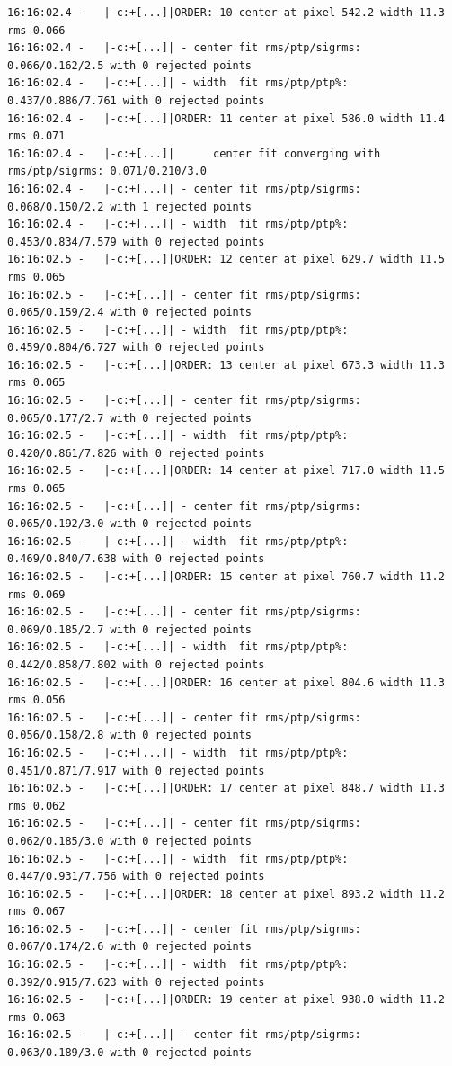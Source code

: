 \begin{lstlisting}[style=text]
16:16:02.4 -   |-c:+[...]|ORDER: 10 center at pixel 542.2 width 11.3 rms 0.066
16:16:02.4 -   |-c:+[...]| - center fit rms/ptp/sigrms: 0.066/0.162/2.5 with 0 rejected points
16:16:02.4 -   |-c:+[...]| - width  fit rms/ptp/ptp%: 0.437/0.886/7.761 with 0 rejected points
16:16:02.4 -   |-c:+[...]|ORDER: 11 center at pixel 586.0 width 11.4 rms 0.071
16:16:02.4 -   |-c:+[...]|      center fit converging with rms/ptp/sigrms: 0.071/0.210/3.0
16:16:02.4 -   |-c:+[...]| - center fit rms/ptp/sigrms: 0.068/0.150/2.2 with 1 rejected points
16:16:02.4 -   |-c:+[...]| - width  fit rms/ptp/ptp%: 0.453/0.834/7.579 with 0 rejected points
16:16:02.5 -   |-c:+[...]|ORDER: 12 center at pixel 629.7 width 11.5 rms 0.065
16:16:02.5 -   |-c:+[...]| - center fit rms/ptp/sigrms: 0.065/0.159/2.4 with 0 rejected points
16:16:02.5 -   |-c:+[...]| - width  fit rms/ptp/ptp%: 0.459/0.804/6.727 with 0 rejected points
16:16:02.5 -   |-c:+[...]|ORDER: 13 center at pixel 673.3 width 11.3 rms 0.065
16:16:02.5 -   |-c:+[...]| - center fit rms/ptp/sigrms: 0.065/0.177/2.7 with 0 rejected points
16:16:02.5 -   |-c:+[...]| - width  fit rms/ptp/ptp%: 0.420/0.861/7.826 with 0 rejected points
16:16:02.5 -   |-c:+[...]|ORDER: 14 center at pixel 717.0 width 11.5 rms 0.065
16:16:02.5 -   |-c:+[...]| - center fit rms/ptp/sigrms: 0.065/0.192/3.0 with 0 rejected points
16:16:02.5 -   |-c:+[...]| - width  fit rms/ptp/ptp%: 0.469/0.840/7.638 with 0 rejected points
16:16:02.5 -   |-c:+[...]|ORDER: 15 center at pixel 760.7 width 11.2 rms 0.069
16:16:02.5 -   |-c:+[...]| - center fit rms/ptp/sigrms: 0.069/0.185/2.7 with 0 rejected points
16:16:02.5 -   |-c:+[...]| - width  fit rms/ptp/ptp%: 0.442/0.858/7.802 with 0 rejected points
16:16:02.5 -   |-c:+[...]|ORDER: 16 center at pixel 804.6 width 11.3 rms 0.056
16:16:02.5 -   |-c:+[...]| - center fit rms/ptp/sigrms: 0.056/0.158/2.8 with 0 rejected points
16:16:02.5 -   |-c:+[...]| - width  fit rms/ptp/ptp%: 0.451/0.871/7.917 with 0 rejected points
16:16:02.5 -   |-c:+[...]|ORDER: 17 center at pixel 848.7 width 11.3 rms 0.062
16:16:02.5 -   |-c:+[...]| - center fit rms/ptp/sigrms: 0.062/0.185/3.0 with 0 rejected points
16:16:02.5 -   |-c:+[...]| - width  fit rms/ptp/ptp%: 0.447/0.931/7.756 with 0 rejected points
16:16:02.5 -   |-c:+[...]|ORDER: 18 center at pixel 893.2 width 11.2 rms 0.067
16:16:02.5 -   |-c:+[...]| - center fit rms/ptp/sigrms: 0.067/0.174/2.6 with 0 rejected points
16:16:02.5 -   |-c:+[...]| - width  fit rms/ptp/ptp%: 0.392/0.915/7.623 with 0 rejected points
16:16:02.5 -   |-c:+[...]|ORDER: 19 center at pixel 938.0 width 11.2 rms 0.063
16:16:02.5 -   |-c:+[...]| - center fit rms/ptp/sigrms: 0.063/0.189/3.0 with 0 rejected points

\end{lstlisting}
